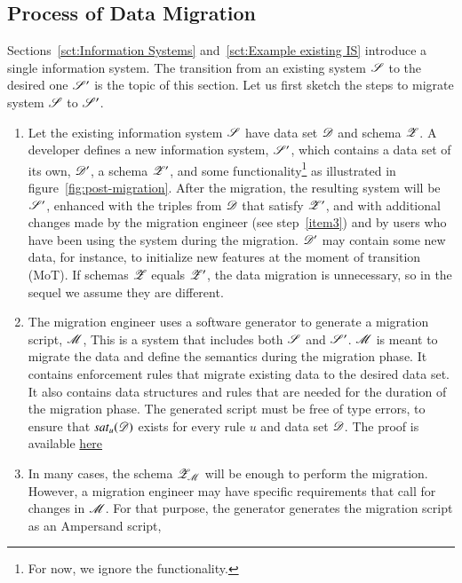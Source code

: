 \documentclass{elsarticle}
\begin{document}
\subsection{Process of Data Migration}
   Sections~\ref{sct:Information Systems} and~\ref{sct:Example existing IS} introduce a single information system.
   The transition from an existing system $\mathscr{S}$ to the desired one $\mathscr{S}'$ is the topic of this section.
   Let us first sketch the steps to migrate system $\mathscr{S}$ to $\mathscr{S}'$.
\begin{enumerate}
   \item Let the existing information system $\mathscr{S}$ have data set $\mathscr{D}$ and schema $\mathscr{Z}$.
         A developer defines a new information system, $\mathscr{S}'$, which contains a data set of its own, $\mathscr{D}'$, a schema $\mathscr{Z}'$, and some functionality\footnote{For now, we ignore the functionality.} as illustrated in figure~\ref{fig:post-migration}.
         After the migration, the resulting system will be $\mathscr{S}'$, enhanced with the triples from $\mathscr{D}$ that satisfy $\mathscr{Z}'$,
         and with additional changes made by the migration engineer (see step~\ref{item3}) and by users who have been using the system during the migration.
         $\mathscr{D}'$ may contain some new data,
         for instance, to initialize new features at the moment of transition (MoT).
         If schemas $\mathscr{Z}$ equals $\mathscr{Z}'$, the data migration is unnecessary, so in the sequel we assume they are different.
   \item The migration engineer uses a software generator to generate a migration script, $\mathscr{M}$,
         This is a system that includes both $\mathscr{S}$ and $\mathscr{S}'$.
         $\mathscr{M}$ is meant to migrate the data and define the semantics during the migration phase.
         It contains enforcement rules that migrate existing data to the desired data set.
         It also contains data structures and rules that are needed for the duration of the migration phase.
         The generated script must be free of type errors, to ensure that $\text{\it sat\/}_{u}(\mathscr{D})$ exists for every rule $u$ and data set $\mathscr{D}$.
         The proof is available \href{https://www.isa-afp.org/}{here}
   \item\label{item3}
         In many cases, the schema $\mathscr{Z}_{\mathscr{M}}$ will be enough to perform the migration.
         However, a migration engineer may have specific requirements that call for changes in $\mathscr{M}$.
         For that purpose, the generator generates the migration script as an Ampersand script,

\end{enumerate}
\end{document}
